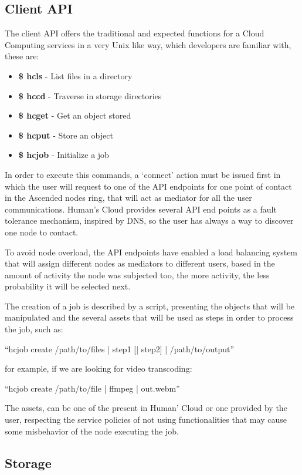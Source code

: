 \documentclass{./llncs2e/llncs}
\begin{document}
\subsection{Client API}

The client API offers the traditional and expected functions for a Cloud Computing services in a very Unix like way, which developers are familiar with, these are:

\begin{itemize}
   \item \textbf{\$ hcls}  - List files in a directory
   \item \textbf{\$ hccd}  - Traverse in storage directories   
   \item \textbf{\$ hcget} - Get an object stored
   \item \textbf{\$ hcput} - Store an object
   \item \textbf{\$ hcjob} - Initialize a job   
\end{itemize} 

In order to execute this commands, a `connect' action must be issued first in which the user will request to one of the API endpoints for one point of contact in the Ascended nodes ring, that will act as mediator for all the user communications. Human's Cloud provides several API end points as a fault tolerance mechanism, inspired by DNS, so the user has always a way to discover one node to contact.

To avoid node overload, the API endpoints have enabled a load balancing system that will assign different nodes as mediators to different users, based in the amount of activity the node was subjected too, the more activity, the less probability it will be selected next.

The creation of a job is described by a script, presenting the objects that will be manipulated and the several assets that will be used as steps in order to process the job, such as:

``hcjob create /path/to/files | step1 [| step2] | /path/to/output''

for example, if we are looking for video transcoding:

``hcjob create /path/to/file | ffmpeg | out.webm''
  
The assets, can be one of the present in Human' Cloud or one provided by the user, respecting the service policies of not using functionalities that may cause some misbehavior of the node executing the job. 


\subsection{Storage}
\end{document}
